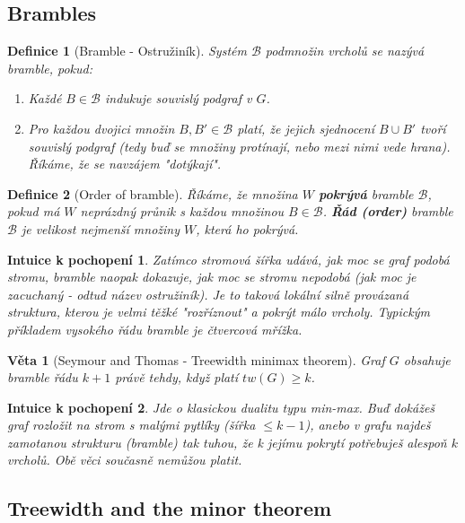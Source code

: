 \documentclass[a4paper,11pt]{article}
\newtheorem{definition}{Definice}[section]
\newtheorem{theorem}{Věta}[section]
\newtheorem*{intuition}{Intuice k pochopení}
\begin{document}
\subsection{Brambles}

\begin{definition}[Bramble - Ostružiník]
Systém $\mathcal{B}$ podmnožin vrcholů se nazývá bramble, pokud:
\begin{enumerate}
    \item Každé $B \in \mathcal{B}$ indukuje souvislý podgraf v $G$.
    \item Pro každou dvojici množin $B, B' \in \mathcal{B}$ platí, že jejich sjednocení $B \cup B'$ tvoří souvislý podgraf (tedy buď se množiny protínají, nebo mezi nimi vede hrana). Říkáme, že se navzájem "dotýkají".
\end{enumerate}
\end{definition}

\begin{definition}[Order of bramble]
Říkáme, že množina $W$ \textbf{pokrývá} bramble $\mathcal{B}$, pokud má $W$ neprázdný průnik s každou množinou $B \in \mathcal{B}$. \textbf{Řád (order)} bramble $\mathcal{B}$ je velikost nejmenší množiny $W$, která ho pokrývá.
\end{definition}

\begin{intuition}
Zatímco stromová šířka udává, jak moc se graf \textit{podobá stromu}, bramble naopak dokazuje, jak moc se \textit{stromu nepodobá} (jak moc je zacuchaný - odtud název ostružiník). Je to taková lokální silně provázaná struktura, kterou je velmi těžké "rozříznout" a pokrýt málo vrcholy. Typickým příkladem vysokého řádu bramble je čtvercová mřížka. 
\end{intuition}

\begin{theorem}[Seymour and Thomas - Treewidth minimax theorem]
Graf $G$ obsahuje bramble řádu $k+1$ právě tehdy, když platí $tw(G) \ge k$.
\end{theorem}

\begin{intuition}
Jde o klasickou dualitu typu min-max. Buď dokážeš graf rozložit na strom s malými pytlíky (šířka $\le k-1$), anebo v grafu najdeš zamotanou strukturu (bramble) tak tuhou, že k jejímu pokrytí potřebuješ alespoň $k$ vrcholů. Obě věci současně nemůžou platit.
\end{intuition}

\subsection{Treewidth and the minor theorem}
\end{document}
